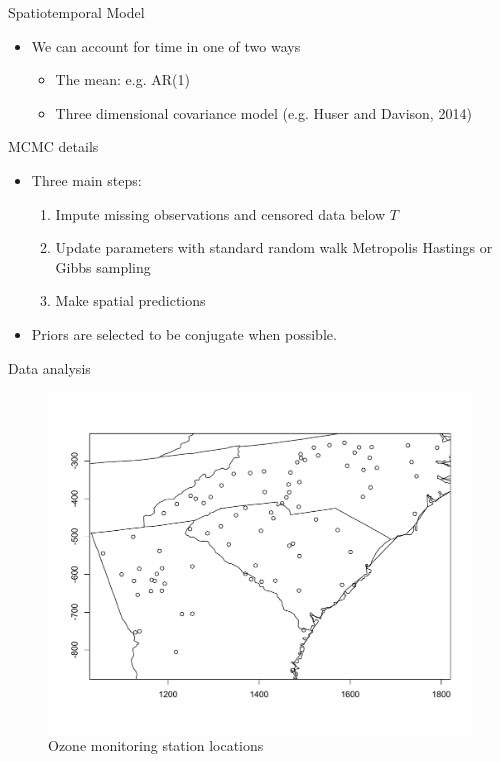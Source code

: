 \documentclass{beamer}
\begin{document}
\begin{frame}{Spatiotemporal Model}
  \begin{itemize} \setlength{\itemsep}{0.5em}
    \item We can account for time in one of two ways
    \begin{itemize}
    	\item The mean: e.g. AR(1)
	\item Three dimensional covariance model (e.g. Huser and Davison, 2014)
    \end{itemize}
  \end{itemize}
\end{frame}

\begin{frame}{MCMC details}
  \begin{itemize} \setlength{\itemsep}{0.5em}
    \item Three main steps:
    \begin{enumerate}[1.]
      \item Impute missing observations and censored data below $T$
      \item Update parameters with standard random walk Metropolis Hastings or Gibbs sampling
      \item Make spatial predictions
    \end{enumerate}
    \item Priors are selected to be conjugate when possible.
  \end{itemize}
\end{frame}

\begin{frame}{Data analysis}
	\centering
	\begin{figure}
    \includegraphics[width=0.8\linewidth]{./plots/ozone_station.pdf}
    \caption{Ozone monitoring station locations}
    \end{figure}

\end{frame}
\end{document}

